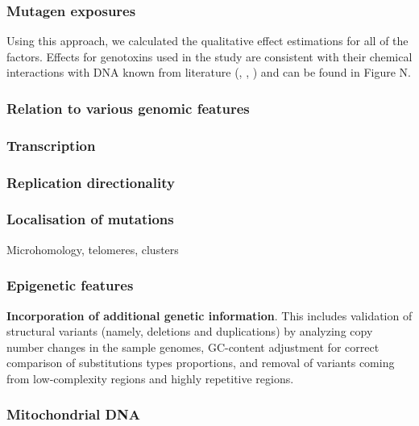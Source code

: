 \subsubsection{Mutagen exposures}

Using this approach, we calculated the qualitative effect estimations for all of the factors. Effects for genotoxins used in the study are consistent with their chemical interactions with DNA known from literature (\cite{Helleday}, \cite{DNAdamagerepair}, \cite{Meier1}) and can be found in Figure N.





\subsubsection{Relation to various genomic features}

\subsubsection*{Transcription}

\subsubsection*{Replication directionality}

\subsubsection*{Localisation of mutations}

Microhomology, telomeres, clusters

\subsubsection*{Epigenetic features}

\textbf{Incorporation of additional genetic information}. This includes validation of structural variants (namely, deletions and duplications) by analyzing copy number changes in the sample genomes, GC-content adjustment for correct comparison of substitutions types proportions, and removal of variants coming from low-complexity regions and highly repetitive regions. 

\subsubsection*{Mitochondrial DNA}


